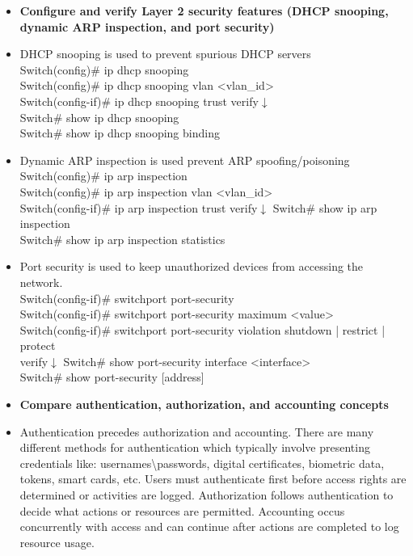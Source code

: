\documentclass{article}
\begin{document}
\begin{itemize}
  \item \textbf{Configure and verify Layer 2 security features (DHCP snooping, dynamic ARP inspection, and port security)}
  	\item[] DHCP snooping is used to prevent spurious DHCP servers\\
  		Switch(config)\# ip dhcp snooping\\
		Switch(config)\# ip dhcp snooping vlan \textless vlan\_id\textgreater\\
		Switch(config-if)\# ip dhcp snooping trust
		verify$\downarrow$\\
		Switch\# show ip dhcp snooping\\
		Switch\# show ip dhcp snooping binding
  	\item[] Dynamic ARP inspection is used prevent ARP spoofing/poisoning\\
  		Switch(config)\# ip arp inspection\\
		Switch(config)\# ip arp inspection vlan \textless vlan\_id\textgreater\\
		Switch(config-if)\# ip arp inspection trust
		verify$\downarrow$
		Switch\# show ip arp inspection\\
		Switch\# show ip arp inspection statistics
  	\item[] Port security is used to keep unauthorized devices from accessing the network.\\
  		Switch(config-if)\# switchport port-security\\
		Switch(config-if)\# switchport port-security maximum \textless value\textgreater\\
		Switch(config-if)\# switchport port-security violation {shutdown | restrict | protect}\\
		verify$\downarrow$
		Switch\# show port-security interface \textless interface\textgreater\\
		Switch\# show port-security [address]
  
  \item \textbf{Compare authentication, authorization, and accounting concepts}
  	\item[] Authentication precedes authorization and accounting. There are many different methods for authentication which typically involve presenting credentials like: usernames\textbackslash{}passwords, digital certificates, biometric data, tokens, smart cards, etc. Users must authenticate first before access rights are determined or activities are logged. Authorization follows authentication to decide what actions or resources are permitted. Accounting occus concurrently with access and can continue after actions are completed to log resource usage.
  

\end{itemize}
\end{document}
